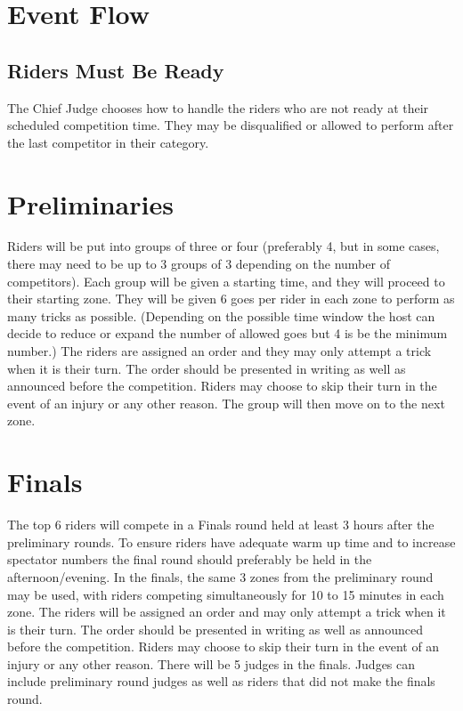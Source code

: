 \section{Event Flow}

\subsection{Riders Must Be Ready}
The Chief Judge chooses how to handle the riders who are not ready at their scheduled competition time.
They may be disqualified or allowed to perform after the last competitor in their category.

\section{Preliminaries}
Riders will be put into groups of three or four (preferably 4, but in some cases, there may need to be up to 3 groups of 3 depending on the number of competitors).
Each group will be given a starting time, and they will proceed to their starting zone.
They will be given 6 goes per rider in each zone to perform as many tricks as possible.
(Depending on the possible time window the host can decide to reduce or expand the number of allowed goes but 4 is be the minimum number.)
The riders are assigned an order and they may only attempt a trick when it is their turn.
The order should be presented in writing as well as announced before the competition.
Riders may choose to skip their turn in the event of an injury or any other reason.
The group will then move on to the next zone.

\section{Finals}
The top 6 riders will compete in a Finals round held at least 3 hours after the preliminary rounds.
To ensure riders have adequate warm up time and to increase spectator numbers the final round should preferably be held in the afternoon/evening.
In the finals, the same 3 zones from the preliminary round may be used, with riders competing simultaneously for 10 to 15 minutes in each zone.
The riders will be assigned an order and may only attempt a trick when it is their turn.
The order should be presented in writing as well as announced before the competition.
Riders may choose to skip their turn in the event of an injury or any other reason.
There will be 5 judges in the finals.
Judges can include preliminary round judges as well as riders that did not make the finals round.

